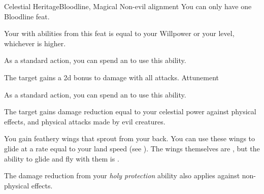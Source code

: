     \begin{feat}{Celestial Heritage}{Bloodline, Magical}
        \featpre Non-evil alignment
         You can only have one Bloodline feat.
        \featben

         Your  with abilities from this feat is equal to your Willpower or your level, whichever is higher.

         As a standard action, you can spend an  to use this ability.
        \begin{ability}
            \begin{spelltargetinginfo}
            \end{spelltargetinginfo}
            \begin{spelleffects}
                \spelleffect The target gains a \plus2d bonus to damage with all attacks.
                \spelldur Attunement
            \end{spelleffects}
        \end{ability}

         As a standard action, you can spend an  to use this ability.
        \begin{ability}
            \begin{spelltargetinginfo}
            \end{spelltargetinginfo}
            \begin{spelleffects}
                \spelleffect The target gains damage reduction equal to your celestial power against  physical effects, and physical attacks made by evil creatures.
            \end{spelleffects}
        \end{ability}

         You gain feathery wings that sprout from your back.
        You can use these wings to glide at a rate equal to your land speed (see ).
        The wings themselves are , but the ability to glide and fly with them is .

         The damage reduction from your \textit{holy protection} ability also applies against non-physical effects.


\end{feat}
